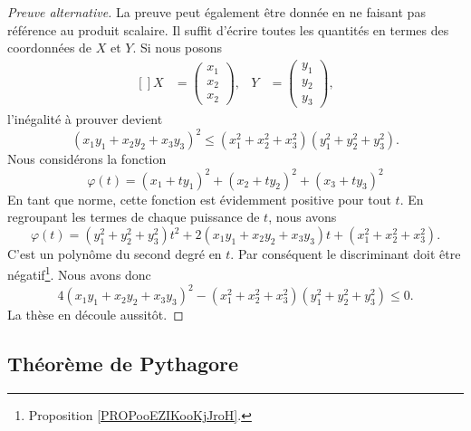 \begin{proof}[Preuve alternative]
	La preuve peut également être donnée en ne faisant pas référence au produit scalaire. Il suffit d'écrire toutes les quantités en termes des coordonnées de \( X\) et \( Y\). Si nous posons
	\begin{equation}
		\begin{aligned}[]
			X & =\begin{pmatrix}
				x_1 \\
				x_2 \\
				x_2
			\end{pmatrix},
			  & Y                            & =\begin{pmatrix}
				y_1 \\
				y_2 \\
				y_3
			\end{pmatrix},
		\end{aligned}
	\end{equation}
	l'inégalité à prouver devient
	\begin{equation}
		(x_1y_1+x_2y_2+x_3y_3)^2\leq (x_1^2+x_2^2+x_3^2)(y_1^2+y_2^2+y_3^2).
	\end{equation}
	Nous considérons la fonction
	\begin{equation}
		\varphi(t)=(x_1+ty_1)^2+(x_2+ty_2)^2+(x_3+ty_3)^2
	\end{equation}
	En tant que norme, cette fonction est évidemment positive pour tout \( t\). En regroupant les termes de chaque puissance de \( t\), nous avons
	\begin{equation}
		\varphi(t)=(y_1^2+y_2^2+y_3^2)t^2+2(x_1y_1+x_2y_2+x_3y_3)t+(x_1^2+x_2^2+x_3^2).
	\end{equation}
	C'est un polynôme du second degré en \( t\). Par conséquent le discriminant doit être négatif\footnote{Proposition \ref{PROPooEZIKooKjJroH}.}. Nous avons donc
	\begin{equation}
		4(x_1y_1+x_2y_2+x_3y_3)^2-(x_1^2+x_2^2+x_3^2)(y_1^2+y_2^2+y_3^2)\leq 0.
	\end{equation}
	La thèse en découle aussitôt.
\end{proof}

\subsection{Théorème de Pythagore}

